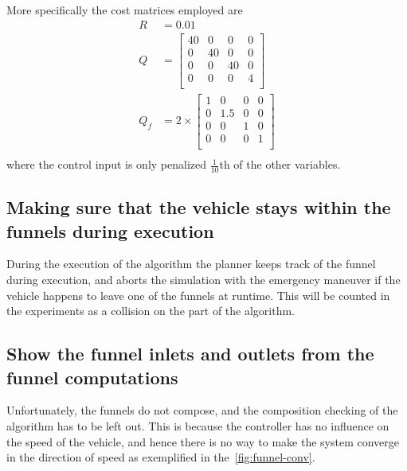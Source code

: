 More specifically the cost matrices employed are
\begin{align*}
  R &= 0.01 \\
  Q &= \begin{bmatrix}
    40 & 0 & 0 & 0 \\
    0 & 40 & 0 & 0 \\
    0 & 0 & 40 & 0 \\
    0 & 0 & 0 & 4 \\
  \end{bmatrix}
  \\
  Q_{f} &=
          2\times
          \begin{bmatrix}
            1 & 0 & 0 & 0 \\
            0 & 1.5 & 0 & 0 \\
            0 & 0 & 1 & 0 \\
            0 & 0 & 0 & 1 \\
          \end{bmatrix}
  \\
\end{align*}
where the control input is only penalized \(\frac{1}{10}\)th of the other
variables.

\subsection{Making sure that the vehicle stays within the funnels during
  execution}

During the execution of the \rrtfunnel{} algorithm the planner keeps track of
the funnel during execution, and aborts the simulation with the emergency
maneuver if the vehicle happens to leave one of the funnels at runtime. This
will be counted in the experiments as a collision on the part of the
\rrtfunnel{} algorithm.

\subsection{Show the funnel inlets and outlets from the funnel computations}

Unfortunately, the funnels do not compose, and the composition checking of the
algorithm has to be left out. This is because the controller has no influence on
the speed of the vehicle, and hence there is no way to make the system converge
in the direction of speed as exemplified in the~\cref{fig:funnel-conv}.

